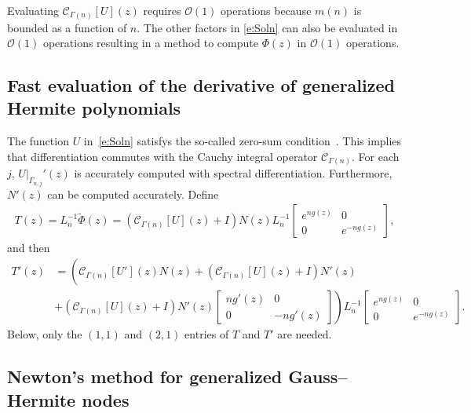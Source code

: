\documentclass[final]{siamltex}
\begin{document}
Evaluating $\mathcal C_{\Gamma(n)} [U](z)$ requires $\mathcal O(1)$ operations because $m(n)$ is bounded as a function of $n$.  The other factors in \eqref{e:Soln} can also be evaluated in $\mathcal O(1)$ operations resulting in a method to compute $\Phi(z)$ in $\mathcal O(1)$ operations.

\subsection{Fast evaluation of the derivative of generalized Hermite polynomials}

The function $U$ in~\eqref{e:Soln} satisfys the so-called zero-sum condition~\cite[Definition 3.5]{TrogdonSONNSD}.  This implies that differentiation commutes with the Cauchy integral operator ${\mathcal C}_{\Gamma(n)}$. For each $j$, $U|_{\Gamma_{n,j}}'(z)$ is accurately computed with spectral differentiation.  Furthermore, $N'(z)$ can be computed accurately.  Define
\begin{align*}
T(z) = L_n^{-1}\tilde{\Phi}(z) = ({\mathcal C}_{\Gamma(n)}[U](z)+ I)N(z) L_n^{-1} \begin{bmatrix} e^{n g(z)} & 0 \\ 0 & e^{-ng(z)} \end{bmatrix},
\end{align*}
and then
\begin{align*}
T'(z) &= \left({\mathcal C}_{\Gamma(n)}[U'](z)N(z) + ({\mathcal C}_{\Gamma(n)}[U](z)+ I) N'(z) \phantom{\begin{bmatrix} 1 \\ 1 \end{bmatrix}}\right.\\
&\left.+  ({\mathcal C}_{\Gamma(n)}[U](z)+ I) N'(z)\begin{bmatrix} ng'(z) & 0 \\ 0 & -ng'(z) \end{bmatrix} \right) L_n^{-1}\begin{bmatrix} e^{n g(z)} & 0 \\ 0 & e^{-ng(z)} \end{bmatrix}.
\end{align*}
Below, only the $(1,1)$ and $(2,1)$ entries of $T$ and $T'$ are needed.

\subsection{Newton's method for generalized Gauss--Hermite nodes}
\end{document}
